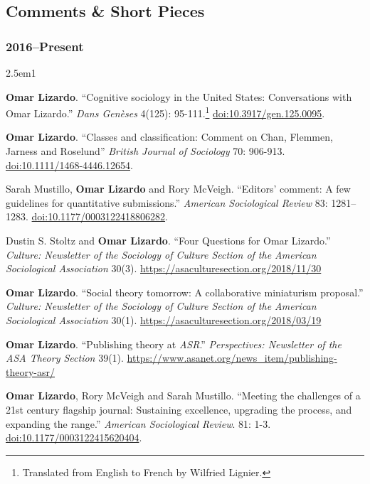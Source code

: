 \documentclass[
]{article}
\newenvironment{cventry}{\begin{hangparas}{2.5em}{1}}{\end{hangparas}}
\begin{document}
\subsection{Comments \& Short Pieces}\label{comments-short-pieces}

\subsubsection{2016--Present}\label{present}

\begin{cventry}

\textbf{Omar Lizardo}. ``Cognitive sociology in the United States:
Conversations with Omar Lizardo.'' \emph{Dans Genèses} 4(125):
95-111.\footnote{Translated from English to French by Wilfried Lignier.}
\href{https://doi.org/10.3917/gen.125.0095}{doi:10.3917/gen.125.0095}.

\textbf{Omar Lizardo}. ``Classes and classification: Comment on Chan,
Flemmen, Jarness and Roselund'' \emph{British Journal of Sociology} 70:
906-913.
\href{https://doi.org/10.1111/1468-4446.12654}{doi:10.1111/1468-4446.12654}.

Sarah Mustillo, \textbf{Omar Lizardo} and Rory McVeigh. ``Editors'
comment: A few guidelines for quantitative submissions.'' \emph{American
Sociological Review} 83: 1281--1283.
\href{https://doi.org/10.1177/0003122418806282}{doi:10.1177/0003122418806282}.

Dustin S. Stoltz and \textbf{Omar Lizardo}. ``Four Questions for Omar
Lizardo.'' \emph{Culture: Newsletter of the Sociology of Culture Section
of the American Sociological Association} 30(3).
\href{https://asaculturesection.org/2018/11/30/four-questions-for-omar-lizardo/}{https://asaculturesection.org/2018/11/30}

\textbf{Omar Lizardo}. ``Social theory tomorrow: A collaborative
miniaturism proposal.'' \emph{Culture: Newsletter of the Sociology of
Culture Section of the American Sociological Association} 30(1).
\href{https://asaculturesection.org/2018/03/19/symposium-on-social-theory-now-social-theory-tomorrow-a-collaborative-miniaturism-proposal/}{https://asaculturesection.org/2018/03/19}

\textbf{Omar Lizardo}. ``Publishing theory at \emph{ASR}.''
\emph{Perspectives: Newsletter of the ASA Theory Section} 39(1).
\url{https://www.asanet.org/news_item/publishing-theory-asr/}

\textbf{Omar Lizardo}, Rory McVeigh and Sarah Mustillo. ``Meeting the
challenges of a 21st century flagship journal: Sustaining excellence,
upgrading the process, and expanding the range.'' \emph{American
Sociological Review}. 81: 1-3.
\href{https://doi.org/10.1177/0003122415620404}{doi:10.1177/0003122415620404}.

\end{cventry}
\end{document}
